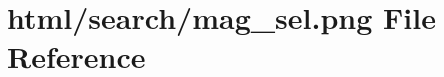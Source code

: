 \hypertarget{mag__sel_8png}{}\section{html/search/mag\+\_\+sel.png File Reference}
\label{mag__sel_8png}
